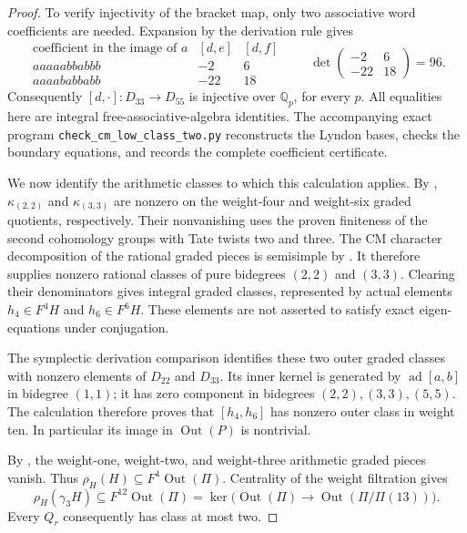 \documentclass[11pt]{article}
\theoremstyle{definition}\newtheorem{definition}[theorem]{Definition}
\begin{document}
\begin{proof}
To verify injectivity of the bracket map, only two associative
word coefficients are needed.  Expansion by the derivation rule
gives
\[
\begin{array}{c|rr}
 \text{coefficient in the image of }a &[d,e]&[d,f]\\ \hline
 aaaaabbabbb&-2&6\\
 aaaababbabb&-22&18
\end{array}
\qquad
\det\begin{pmatrix}-2&6\\-22&18\end{pmatrix}=96.
\]
Consequently \([d,\cdot]:D_{33}\longrightarrow D_{55}\) is
injective over \(\mathbb Q_p\), for every \(p\).
All equalities here are integral free-associative-algebra
identities.  The accompanying exact program
\texttt{check\_cm\_low\_class\_two.py} reconstructs the Lyndon
bases, checks the boundary equations, and records the complete
coefficient certificate.

We now identify the arithmetic classes to which this calculation
applies.  By \cite[Theorem 2.8 and Lemma 2.10, p.~9]{Ishii},
\(\kappa_{(2,2)}\) and \(\kappa_{(3,3)}\) are nonzero on the
weight-four and weight-six graded quotients, respectively.
Their nonvanishing uses the proven finiteness of the
second cohomology groups with Tate twists two and three.
The CM character decomposition of the rational graded pieces
is semisimple by \cite[Proposition 2.2]{Ishii}.
It therefore supplies nonzero rational classes of pure
bidegrees \((2,2)\) and \((3,3)\).
Clearing their denominators gives integral graded classes,
represented by actual elements \(h_4\in F^4H\) and
\(h_6\in F^6H\).
These elements are not asserted to satisfy exact eigen-equations
under conjugation.

The symplectic derivation comparison
\cite[Proposition 3.3(4), pp.~12--14]{IshiiLie} identifies these
two outer graded classes with nonzero elements of \(D_{22}\)
and \(D_{33}\).  Its inner kernel is generated by
\(\operatorname{ad}[a,b]\) in bidegree \((1,1)\);
it has zero component in bidegrees \((2,2),(3,3),(5,5)\).
The calculation therefore proves that
\([h_4,h_6]\) has nonzero outer class in weight ten.
In particular its image in \(\operatorname{Out}(P)\) is nontrivial.

By \cite[Proposition 2.2(1)]{Ishii}, the weight-one,
weight-two, and weight-three arithmetic graded pieces vanish.
Thus \(\rho_H(H)\subseteq F^4\operatorname{Out}(\Pi)\).
Centrality of the weight filtration gives
\[
 \rho_H(\gamma_3H)\subseteq F^{12}\operatorname{Out}(\Pi)
       =\ker\bigl(\operatorname{Out}(\Pi)\longrightarrow
                              \operatorname{Out}(\Pi/\Pi(13))\bigr).
\]
Every \(Q_r\) consequently has class at most two.


\end{proof}
\end{document}

